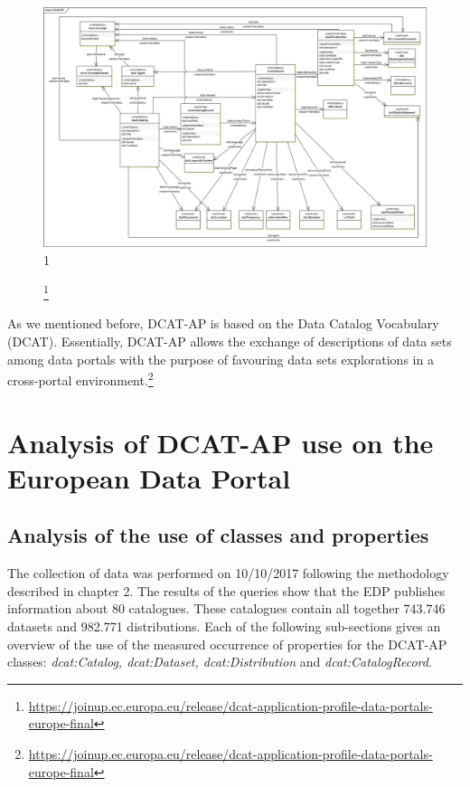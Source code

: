 \documentclass[<options>]{elsarticle}
\begin{document}
\begin{figure}[H]
\includegraphics[width=1\textwidth]{DCAT-AP_Final_v1_00.png}
1\caption[Caption for LOC]{\footnote{\href{DCAT-AP UML Class Diagram}{https://joinup.ec.europa.eu/release/dcat-application-profile-data-portals-europe-final}}}
\end{figure}

As we mentioned before, DCAT-AP is based on the Data Catalog Vocabulary (DCAT). Essentially, DCAT-AP allows the exchange of descriptions of data sets among data portals with the purpose of favouring data sets explorations in a cross-portal environment.\footnote{\href{DCAT Application Profile for Data Portals in Europe}{https://joinup.ec.europa.eu/release/dcat-application-profile-data-portals-europe-final}}

\section{Analysis of DCAT-AP use on the European Data Portal}

\subsection{Analysis of the use of classes and properties} \label{EDPUse}
The collection of data was performed on 10/10/2017 following the methodology described in chapter 2. The results of the queries show that the EDP publishes information about 80 catalogues. These catalogues contain all together 743.746 datasets and 982.771 distributions. Each of the following sub-sections gives an overview of the use of the measured occurrence of properties for the DCAT-AP classes: \textit{dcat:Catalog, dcat:Dataset, dcat:Distribution} and \textit{dcat:CatalogRecord}.
\end{document}
